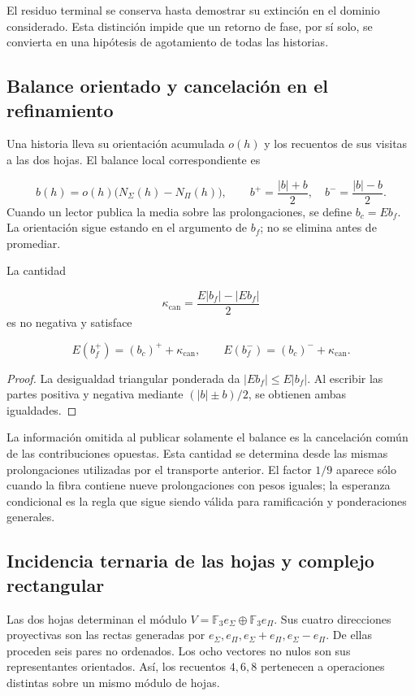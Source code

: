 El residuo terminal se conserva hasta demostrar su extinción en el dominio considerado. Esta distinción impide que un retorno de fase, por sí solo, se convierta en una hipótesis de agotamiento de todas las historias.

\subsection{Balance orientado y cancelación en el refinamiento}
Una historia lleva su orientación acumulada \(o(h)\) y los recuentos de sus visitas a las dos hojas. El balance local correspondiente es

\[
b(h)=o(h)\bigl(N_\Sigma(h)-N_\Pi(h)\bigr),
\qquad
b^+=\frac{|b|+b}{2},\quad b^-=\frac{|b|-b}{2}.
\]
Cuando un lector publica la media sobre las prolongaciones, se define \(b_c=Eb_f\). La orientación sigue estando en el argumento de \(b_f\); no se elimina antes de promediar.

\begin{proposition}
\label{prop:continuo-defecto-cancelacion}
La cantidad

\[
\kappa_{\mathrm{can}}=
\frac{E|b_f|-|Eb_f|}{2}
\]
es no negativa y satisface

\[
E(b_f^+)=(b_c)^++\kappa_{\mathrm{can}},
\qquad
E(b_f^-)=(b_c)^-+\kappa_{\mathrm{can}}.
\]
\end{proposition}
\begin{proof}
La desigualdad triangular ponderada da \(|Eb_f|\leq E|b_f|\). Al escribir las partes positiva y negativa mediante \((|b|\pm b)/2\), se obtienen ambas igualdades.
\end{proof}

La información omitida al publicar solamente el balance es la cancelación común de las contribuciones opuestas. Esta cantidad se determina desde las mismas prolongaciones utilizadas por el transporte anterior. El factor \(1/9\) aparece sólo cuando la fibra contiene nueve prolongaciones con pesos iguales; la esperanza condicional es la regla que sigue siendo válida para ramificación y ponderaciones generales.

\subsection{Incidencia ternaria de las hojas y complejo rectangular}
Las dos hojas determinan el módulo \(V=\mathbb F_3e_\Sigma\oplus\mathbb F_3e_\Pi\). Sus cuatro direcciones proyectivas son las rectas generadas por \(e_\Sigma,e_\Pi,e_\Sigma+e_\Pi,e_\Sigma-e_\Pi\). De ellas proceden seis pares no ordenados. Los ocho vectores no nulos son sus representantes orientados. Así, los recuentos \(4,6,8\) pertenecen a operaciones distintas sobre un mismo módulo de hojas.

